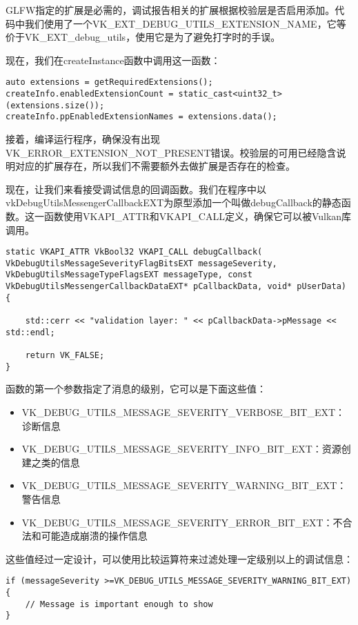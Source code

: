 GLFW指定的扩展是必需的，调试报告相关的扩展根据校验层是否启用添加。代码中我们使用了一个VK\_EXT\_DEBUG\_UTILS\_EXTENSION\_NAME，它等价于VK\_EXT\_debug\_utils，使用它是为了避免打字时的手误。

现在，我们在createInstance函数中调用这一函数：

\begin{lstlisting}[language={[ANSI]C}]
auto extensions = getRequiredExtensions();
createInfo.enabledExtensionCount = static_cast<uint32_t>(extensions.size());
createInfo.ppEnabledExtensionNames = extensions.data();
\end{lstlisting}

接着，编译运行程序，确保没有出现VK\_ERROR\_EXTENSION\_NOT\_PRESENT错误。校验层的可用已经隐含说明对应的扩展存在，所以我们不需要额外去做扩展是否存在的检查。

现在，让我们来看接受调试信息的回调函数。我们在程序中以vkDebugUtilsMessengerCallbackEXT为原型添加一个叫做debugCallback的静态函数。这一函数使用VKAPI\_ATTR和VKAPI\_CALL定义，确保它可以被Vulkan库调用。

\begin{lstlisting}[language={[ANSI]C}]
static VKAPI_ATTR VkBool32 VKAPI_CALL debugCallback( VkDebugUtilsMessageSeverityFlagBitsEXT messageSeverity, VkDebugUtilsMessageTypeFlagsEXT messageType, const VkDebugUtilsMessengerCallbackDataEXT* pCallbackData, void* pUserData) {

	std::cerr << "validation layer: " << pCallbackData->pMessage << std::endl;

	return VK_FALSE;
}
\end{lstlisting}

函数的第一个参数指定了消息的级别，它可以是下面这些值：

\begin{itemize}
	\item VK\_DEBUG\_UTILS\_MESSAGE\_SEVERITY\_VERBOSE\_BIT\_EXT：诊断信息
	\item VK\_DEBUG\_UTILS\_MESSAGE\_SEVERITY\_INFO\_BIT\_EXT：资源创建之类的信息
	\item VK\_DEBUG\_UTILS\_MESSAGE\_SEVERITY\_WARNING\_BIT\_EXT：警告信息
	\item VK\_DEBUG\_UTILS\_MESSAGE\_SEVERITY\_ERROR\_BIT\_EXT：不合法和可能造成崩溃的操作信息
\end{itemize}

这些值经过一定设计，可以使用比较运算符来过滤处理一定级别以上的调试信息：

\begin{lstlisting}[language={[ANSI]C}]
if (messageSeverity >=VK_DEBUG_UTILS_MESSAGE_SEVERITY_WARNING_BIT_EXT) {
	// Message is important enough to show
}
\end{lstlisting}

